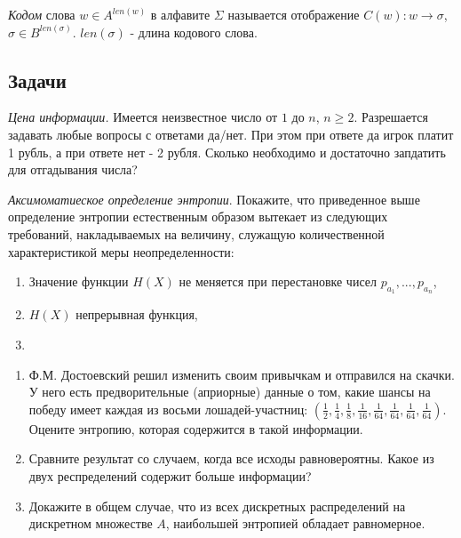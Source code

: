 \begin{definition}
\textit{Кодом} слова $w \in A^{len(w)}$ в алфавите $\Sigma$ называется отображение $C(w) : w \rightarrow \sigma$, $\sigma \in B^{len(\sigma)}$. $len(\sigma)$ - длина кодового слова.
\end{definition}

\subsection{Задачи}

\begin{problem} \textit{Цена информации.} Имеется неизвестное число от $1$ до $n$, $n \geq 2$. Разрешается задавать любые вопросы с ответами да/нет. При этом при ответе да игрок платит 1 рубль, а при ответе нет - 2 рубля. Сколько необходимо и достаточно запдатить для отгадывания числа?
\end{problem}

\begin{problem} \textit{Аксимоматиеское определение энтропии}.
Покажите, что приведенное выше определение энтропии естественным образом вытекает из следующих требований, накладываемых на величину, служащую количественной характеристикой меры неопределенности:
\begin{enumerate}
\item Значение функции $H(X)$ не меняется при перестановке чисел ${p_{a_1},..., p_{a_n}}$,
\item $H(X)$ непрерывная функция,
\item 
\end{enumerate}
\end{problem}

\begin{problem} 
\begin{enumerate}
\item Ф.М. Достоевский решил изменить своим привычкам и отправился на скачки. У него есть предворительные (априорные) данные о том, какие шансы на победу имеет каждая из восьми лошадей-участниц: $(\frac{1}{2}, \frac{1}{4}, \frac{1}{8}, \frac{1}{16}, \frac{1}{64}, \frac{1}{64}, \frac{1}{64}, \frac{1}{64})$. Оцените энтропию, которая содержится в такой информации. 
\item Сравните результат со случаем, когда все исходы равновероятны. Какое из двух респределений содержит больше информации?
\item Докажите в общем случае, что из всех дискретных распределений на дискретном множестве $A$, наибольшей энтропией обладает равномерное.
\end{enumerate}
\end{problem}

